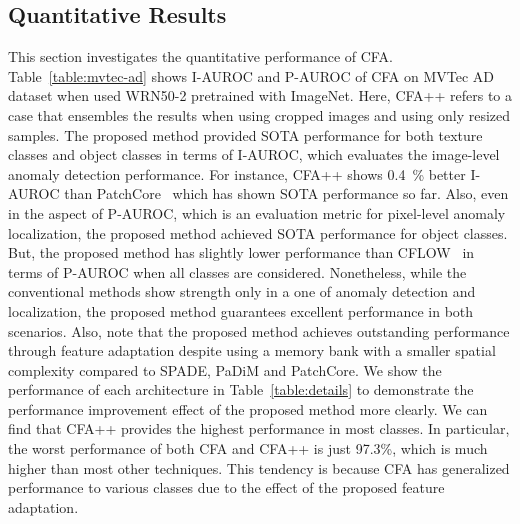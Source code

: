 \documentclass[10pt,twocolumn,letterpaper]{article}
\begin{document}
%
 
    \subsection{Quantitative Results}
        This section investigates the quantitative performance of CFA. Table~\ref{table:mvtec-ad} shows I-AUROC and P-AUROC of CFA on MVTec AD dataset when used WRN50-2 pretrained with ImageNet. Here, CFA++ refers to a case that ensembles the results when using cropped images and using only resized samples. The proposed method provided SOTA performance for both texture classes and object classes in terms of I-AUROC, which evaluates the image-level anomaly detection performance. For instance, CFA++ shows 0.4~\% better I-AUROC than PatchCore~\cite{PatchCore} which has shown SOTA performance so far. Also, even in the aspect of P-AUROC, which is an evaluation metric for pixel-level anomaly localization, the proposed method achieved SOTA performance for object classes. But, the proposed method has slightly lower performance than CFLOW~\cite{cflow} in terms of P-AUROC when all classes are considered. Nonetheless, while the conventional methods show strength only in a one of anomaly detection and localization, the proposed method guarantees excellent performance in both scenarios. Also, note that the proposed method achieves outstanding performance through feature adaptation despite using a memory bank with a smaller spatial complexity compared to SPADE, PaDiM and PatchCore. We show the performance of each architecture in Table~\ref{table:details} to demonstrate the performance improvement effect of the proposed method more clearly. We can find that CFA++ provides the highest performance in most classes. In particular, the worst performance of both CFA and CFA++ is just 97.3\%, which is much higher than most other techniques. This tendency is because CFA has generalized performance to various classes due to the effect of the proposed feature adaptation.
        
        
\end{document}
